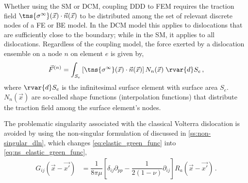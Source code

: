 Whether using the SM or DCM, coupling DDD to FEM requires the traction field $ \tns{\sigma^{\infty}}(\vec{x}) \cdot \vec{n}(\vec{x}) $ to be distributed among the set of relevant discrete nodes of a FE or BE model. In the DCM model this applies to dislocations that are sufficiently close to the boundary; while in the SM, it applies to all dislocations.
Regardless of the coupling model, the force exerted by a dislocation ensemble on a node $ n $ on element $ e $ is given by,
\begin{align}\label{eq:ddd_fem_force_intro}
    \vec{F}^{(n)} = \int_{S_{e}} \left[\tns{\sigma^{\infty}}(\vec{x}) \cdot \vec{n}(\vec{x})\right] N_{n}(\vec{x})\; \rvar{d}S_{e}\,,
\end{align}
where $ \rvar{d}S_{e} $ is the infinitesimal surface element with surface area $ S_{e} $. $ N_{n}(\vec{x}) $ are so-called shape functions (interpolation functions) that distribute the traction field among the surface element's nodes.

The problematic singularity associated with the classical Volterra dislocation is avoided by using the non-singular formulation of \citet{a_non-singular_continuum_theory_of_dislocations} discussed in \cref{ss:non-singular_dln}, which changes \cref{eq:elastic_green_func} into \cref{eq:ns_elastic_green_func},
\begin{align}\label{eq:ns_elastic_green_func}
    G_{ij}(\vec{x} - \vec{x'}) & = \dfrac{1}{8\pi \mu}\left[ \delta_{ij} \partial_{pp} - \dfrac{1}{2(1-\nu)} \partial_{ij} \right] R_{a}(\vec{x} - \vec{x'})\,.
\end{align}

